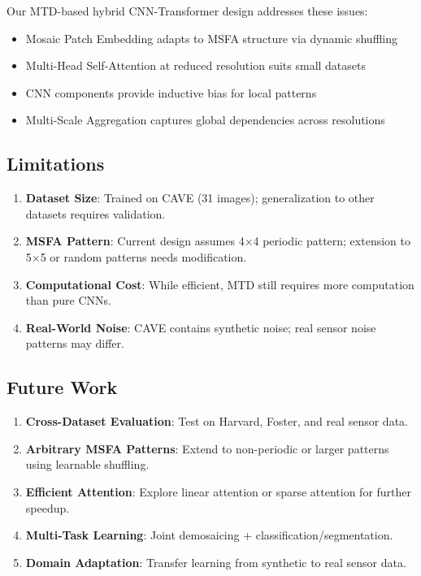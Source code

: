 \documentclass[conference]{IEEEtran}
\begin{document}
Our MTD-based hybrid CNN-Transformer design addresses these issues:
\begin{itemize}
    \item Mosaic Patch Embedding adapts to MSFA structure via dynamic shuffling
    \item Multi-Head Self-Attention at reduced resolution suits small datasets
    \item CNN components provide inductive bias for local patterns
    \item Multi-Scale Aggregation captures global dependencies across resolutions
\end{itemize}

\subsection{Limitations}

\begin{enumerate}
    \item \textbf{Dataset Size}: Trained on CAVE (31 images); generalization to other datasets requires validation.
    
    \item \textbf{MSFA Pattern}: Current design assumes 4×4 periodic pattern; extension to 5×5 or random patterns needs modification.
    
    \item \textbf{Computational Cost}: While efficient, MTD still requires more computation than pure CNNs.
    
    \item \textbf{Real-World Noise}: CAVE contains synthetic noise; real sensor noise patterns may differ.
\end{enumerate}

\subsection{Future Work}

\begin{enumerate}
    \item \textbf{Cross-Dataset Evaluation}: Test on Harvard, Foster, and real sensor data.
    
    \item \textbf{Arbitrary MSFA Patterns}: Extend to non-periodic or larger patterns using learnable shuffling.
    
    \item \textbf{Efficient Attention}: Explore linear attention or sparse attention for further speedup.
    
    \item \textbf{Multi-Task Learning}: Joint demosaicing + classification/segmentation.
    
    \item \textbf{Domain Adaptation}: Transfer learning from synthetic to real sensor data.
\end{enumerate}
\end{document}
